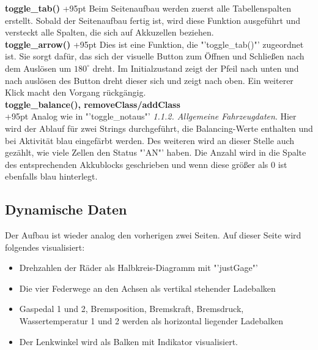 \documentclass[fontsize = 12pt, paper = a4]{scrreprt}
\begin{document}
\textbf{toggle\_tab()}
\hspace{5.8mm}
\hangindent+95pt  
Beim Seitenaufbau werden zuerst alle Tabellenspalten erstellt. Sobald der Seitenaufbau fertig ist, wird diese Funktion ausgeführt und versteckt alle Spalten, die sich auf Akkuzellen beziehen.\\

\textbf{toggle\_arrow()}
\hspace{1mm}
\hangindent+95pt  
Dies ist eine Funktion, die "'toggle\_tab()"' zugeordnet ist. Sie sorgt dafür, das sich der visuelle Button zum Öffnen und Schließen nach dem Auslösen um $180^\circ$  dreht. Im Initialzustand zeigt der Pfeil nach unten und nach auslösen des Button dreht dieser sich und zeigt nach oben. Ein weiterer Klick macht den Vorgang rückgängig.\\


\textbf{toggle\_balance(), removeClass/addClass}\\
\hangindent+95pt  
Analog wie in "'toggle\_notaus"' \textit{1.1.2. Allgemeine Fahrzeugdaten}. Hier wird der Ablauf für zwei Strings durchgeführt, die Balancing-Werte enthalten und bei Aktivität blau eingefärbt werden. Des weiteren wird an dieser Stelle auch gezählt, wie viele Zellen den Status "'AN"' haben. Die Anzahl wird in die Spalte des entsprechenden Akkublocks geschrieben und wenn diese größer als 0 ist ebenfalls blau hinterlegt.\\




\subsection{Dynamische Daten}
Der Aufbau ist wieder analog den vorherigen zwei Seiten. Auf dieser Seite wird folgendes visualisiert: 

\begin{itemize}
\item Drehzahlen der Räder als Halbkreis-Diagramm mit "'justGage"'
\item Die vier Federwege an den Achsen als vertikal stehender Ladebalken 
\item Gaspedal 1 und 2, Bremsposition, Bremskraft, Bremsdruck, Wassertemperatur 1 und 2 werden als horizontal liegender Ladebalken 
\item Der Lenkwinkel wird als Balken mit Indikator visualisiert.  
\end{itemize}
\end{document}
